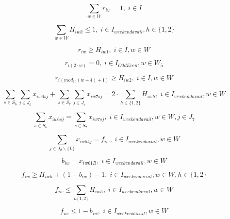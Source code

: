 \begin{equation}
\sum_{w \in W} r_{iw} = 1, \; i \in I
\end{equation}

\begin{equation}
\sum_{w \in W} H_{iwh} \leq 1, \; i \in I_{weekendavail}, h \in \{1,2\}
\end{equation}

\begin{equation}
r_{iw} \geq H_{iw1}, \; i \in I, w \in W
\end{equation}

\begin{equation}
r_{i(2\cdot w)} = 0, \; i \in I_{OddEven}, w \in W_5
\end{equation}

\begin{equation}
r_{i(mod_{10}(w+4)+1)} \geq H_{iw2}, \; i \in I, w \in W
\end{equation}

\begin{equation}
\sum_{s \in S_6} \sum_{j \in J_6} x_{iw6sj} + \sum_{s \in S_7} \sum_{j \in J_7} x_{iw7sj} = 2\cdot \sum_{h \in \{1,2\}} H_{iwh}, \; i \in I_{weekendavail}, w \in W
\end{equation}

\begin{equation}
\sum_{s \in S_6} x_{iw6sj} = \sum_{s \in S_7} x_{iw7sj}, \; i \in I_{weekendavail}, w \in W, j \in J_7
\end{equation}

\begin{equation}
\sum_{j \in J_d \backslash \{L\}} x_{iw54j} = f_{iw}, \; i \in I_{weekendavail}, w \in W
\end{equation}

\begin{equation}
b_{iw} = x_{iw61B}, \; i \in I_{weekendavail}, w \in W
\end{equation}

\begin{equation}
f_{iw} \geq H_{iwh} + (1 - b_{iw}) - 1, \; i \in I_{weekendavail}, w \in W, h \in \{1,2\}
\end{equation}

\begin{equation}
f_{iw} \leq \sum_{h \{1,2\}} H_{iwh}, \; i \in I_{weekendavail}, w \in W
\end{equation}

\begin{equation}
f_{iw} \leq 1 - b_{iw}, \; i \in I_{weekendavail}, w \in W
\end{equation}

